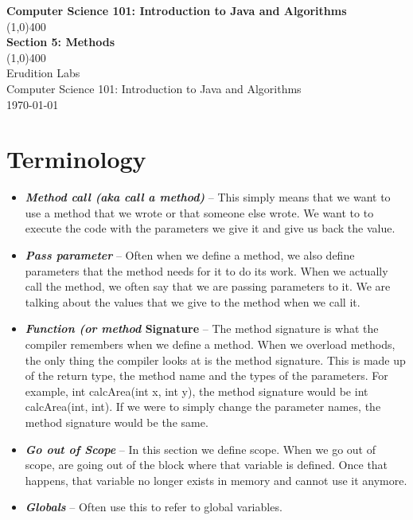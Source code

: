 \documentclass[11]{article}
\begin{document}
\begin{titlepage}
\begin{center}
\vspace{1cm}
\Large{\textbf{Computer Science 101: Introduction to Java and Algorithms}}\\
\vfill
\line(1,0){400}\\
\huge{\textbf{Section 5: Methods}}\\
\line(1,0){400}\\
\vfill
Erudition Labs\\
Computer Science 101: Introduction to Java and Algorithms\\
\today\\
\end{center}
\end{titlepage}

\tableofcontents
\thispagestyle{empty}
\clearpage
\setcounter{page}{1}

\section{Terminology}
\begin{itemize}
  \item \textbf{\textit{Method call (aka call a method)}} --
  This simply means that we want to use a method that we wrote or that someone else wrote. We want to to execute the code with the parameters we give it and give us back the value.

  \item \textbf{\textit{Pass parameter}} --
  Often when we define a method, we also define parameters that the method needs for it to do its work. When we actually call the method, we often say that we are passing parameters to it. We are talking about the values that we give to the method when we call it.
  
  \item \textbf{\textit{Function (or method} Signature} --
  The method signature is what the compiler remembers when we define a method. When we overload methods, the only thing the compiler looks at is the method signature. This is made up of the return type, the method name and the types of the parameters. For example, int calcArea(int x, int y), the method signature would be int calcArea(int, int). If we were to simply change the parameter names, the method signature would be the same.
  
  \item \textbf{\textit{Go out of Scope}} --
	In this section we define scope. When we go out of scope, are going out of the block where that variable is defined. Once that happens, that variable no longer exists in memory and cannot use it anymore.
	
  \item \textbf{\textit{Globals}} -- Often use this to refer to global variables.
  
\end{itemize}
\end{document}
